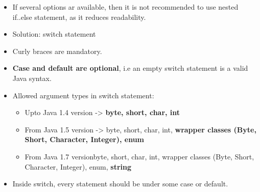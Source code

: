 \setlength{\columnsep}{3pt}
\begin{flushleft}
	
	\begin{itemize}
		\item If several options ar available, then it is not recommended to use nested if..else statement, as it reduces readability.
		
		\item Solution: switch statement
		\bigskip
		\bigskip
		\item Curly braces are mandatory.
		\item \textbf{Case and default are optional}, i.e an empty switch statement is a valid Java syntax.
		\bigskip
		\item Allowed argument types in switch statement:
		\begin{itemize}
			\item Upto Java 1.4 version -> \textbf{byte, short, char, int}
			\item From Java 1.5 version -> byte, short, char, int, \textbf{wrapper classes (Byte, Short, Character, Integer), enum}
			\item From Java 1.7 versionbyte, short, char, int, wrapper classes (Byte, Short, Character, Integer), enum, \textbf{string}
		\end{itemize}
		
		\bigskip	
		\item Inside switch, every statement should be under some case or default.
		
		

\end{itemize}
\end{flushleft}
